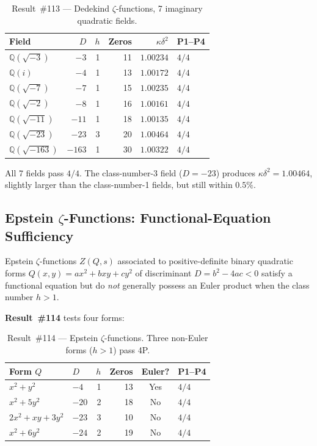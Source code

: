 \documentclass[11pt, a4paper]{article}
\theoremstyle{plain}
\theoremstyle{definition}
\begin{document}
\begin{table}[ht]
\centering
\caption{Result~\#113 — Dedekind $\zeta$-functions, 7 imaginary quadratic fields.}
\label{tab:ded113}
\small
\begin{tabular}{lrrrrl}
\toprule
Field & $D$ & $h$ & Zeros & $\kappa\delta^{2}$ & P1--P4 \\
\midrule
$\mathbb{Q}(\sqrt{-3})$   & $-3$   & 1 & 11 & $1.00234$ & $4/4$ \\
$\mathbb{Q}(i)$           & $-4$   & 1 & 13 & $1.00172$ & $4/4$ \\
$\mathbb{Q}(\sqrt{-7})$   & $-7$   & 1 & 15 & $1.00235$ & $4/4$ \\
$\mathbb{Q}(\sqrt{-2})$   & $-8$   & 1 & 16 & $1.00161$ & $4/4$ \\
$\mathbb{Q}(\sqrt{-11})$  & $-11$  & 1 & 18 & $1.00135$ & $4/4$ \\
$\mathbb{Q}(\sqrt{-23})$  & $-23$  & 3 & 20 & $1.00464$ & $4/4$ \\
$\mathbb{Q}(\sqrt{-163})$ & $-163$ & 1 & 30 & $1.00322$ & $4/4$ \\
\bottomrule
\end{tabular}
\end{table}

All 7 fields pass $4/4$.  The class-number-3 field ($D=-23$) produces
$\kappa\delta^{2}=1.00464$, slightly larger than the class-number-1
fields, but still within $0.5\%$.


\subsection{Epstein $\zeta$-Functions: Functional-Equation Sufficiency}
\label{sec:epstein}
\label{ssec:thm6}

Epstein $\zeta$-functions $Z(Q,s)$ associated to positive-definite
binary quadratic forms $Q(x,y)=ax^{2}+bxy+cy^{2}$ of discriminant
$D=b^{2}-4ac<0$ satisfy a functional equation but do \emph{not}
generally possess an Euler product when the class number $h>1$.

\textbf{Result~\#114} tests four forms:

\begin{table}[ht]
\centering
\caption{Result~\#114 — Epstein $\zeta$-functions.  Three non-Euler forms ($h>1$) pass 4P.}
\label{tab:ep114}
\small
\begin{tabular}{llrrcl}
\toprule
Form $Q$ & $D$ & $h$ & Zeros & Euler? & P1--P4 \\
\midrule
$x^{2}+y^{2}$           & $-4$  & 1 & 13 & Yes & $4/4$ \\
$x^{2}+5y^{2}$          & $-20$ & 2 & 18 & No  & $4/4$ \\
$2x^{2}+xy+3y^{2}$      & $-23$ & 3 & 10 & No  & $4/4$ \\
$x^{2}+6y^{2}$          & $-24$ & 2 & 19 & No  & $4/4$ \\
\bottomrule
\end{tabular}
\end{table}
\end{document}
